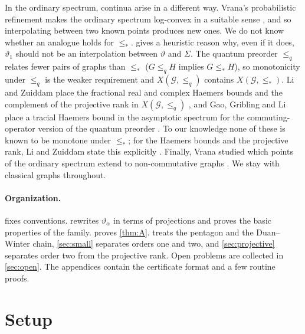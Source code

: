 \documentclass[11pt]{article}
\theoremstyle{definition}
\newcommand{\vt}{\vartheta}
\newcommand{\cG}{\mathcal G}
\newcommand{\Xs}{X(\cG,\le_*)}
\begin{document}
In the ordinary spectrum, continua arise in a different way.  Vrana's
probabilistic refinement makes the ordinary spectrum log-convex in a suitable
sense \cite{Vrana2021}, and so interpolating between two known points produces
new ones.  We do not know whether an analogue holds for $\le_*$.
 gives a heuristic reason why, even if it does, $\vt_1$ should
not be an interpolation between $\vt$ and $\Sigma$.  The quantum preorder
$\le_q$ relates fewer pairs of graphs than $\le_*$ ($G\le_qH$ implies
$G\le_*H$), so monotonicity under $\le_q$ is the weaker requirement and
$X(\cG,\le_q)$ contains $\Xs$.  Li and Zuiddam place the fractional real and
complex Haemers bounds and the complement of the projective rank in
$X(\cG,\le_q)$ \cite[Theorem~22]{LiZuiddam2020}, and Gao, Gribling and Li
place a tracial Haemers bound in the asymptotic spectrum for the
commuting-operator version of the quantum preorder \cite{GaoGriblingLi2022}.
To our knowledge none of these is known to be monotone under $\le_*$; for
the Haemers bounds and the projective rank, Li and Zuiddam state this
explicitly \cite{LiZuiddam2020}.  Finally, Vrana studied which points of the ordinary spectrum
extend to non-commutative graphs \cite{Vrana2022}.  We stay with classical
graphs throughout.

\paragraph{Organization.}
 fixes conventions.   rewrites
$\vt_\alpha$ in terms of projections and proves the basic properties of the
family.   proves \cref{thm:A}.  
treats the pentagon and the Duan--Winter chain, \cref{sec:small}
separates orders one and two, and \cref{sec:projective} separates order two
from the projective rank.  Open problems are collected in
\cref{sec:open}.  The appendices contain the certificate format and a few
routine proofs.

\section{Setup}\label{sec:setup}
\end{document}
